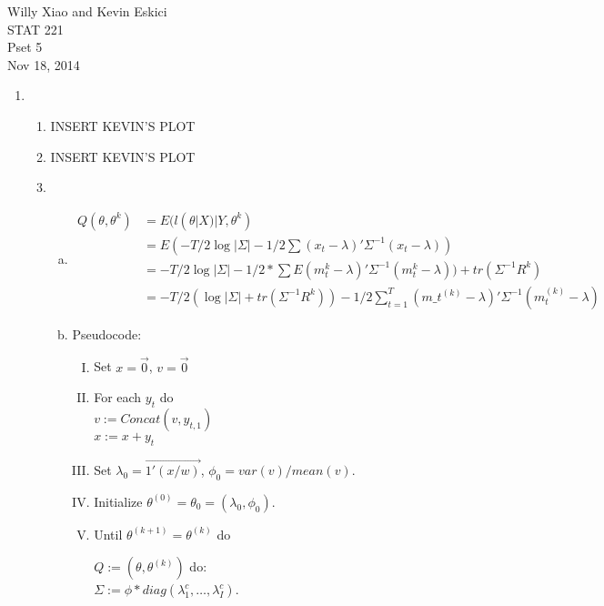 \documentclass[paper=a4, fontsize=11pt]{scrartcl}
\begin{document}
\noindent Willy Xiao and Kevin Eskici \\ STAT 221 \\Pset 5\\ Nov 18, 2014
\begin{enumerate}
  \item
    \begin{enumerate}[1]
      \item INSERT KEVIN'S PLOT
      \item INSERT KEVIN'S PLOT
      \item
        \begin{enumerate}[a.]
          \item
          \begin{align*}
            Q(\theta, \theta^k) &= E(l(\theta|X)|Y, \theta^k) \\
            &= E(-T/2\log{|\Sigma|} - 1/2\sum{(x_t-\lambda)'\Sigma^{-1}(x_t - \lambda)}) \\
            &= -T/2\log{|\Sigma|} - 1/2*\sum{E(m_t^k - \lambda)'\Sigma^{-1}(m_t^k - \lambda)) + tr(\Sigma^{-1}R^{k})} \\
            &= -T/2(\log{|\Sigma|} + tr(\Sigma^{-1}R^k)) - 1/2\sum_{t=1}^{T}{(m\_t^{(k)} - \lambda)'\Sigma^{-1}(m_t^{(k)} - \lambda)}
          \end{align*}
          \item Pseudocode:
            \begin{enumerate}[I.]
              \item Set $x = \vec{0}$, $v = \vec{0}$
              \item For each $y_t$ do \\
                \indent $v := Concat(v, y_{t,1})$ \\
                \indent $x := x + y_t$
              \item Set $\lambda_0 = \overrightarrow{1'(x/w)}$, $\phi_0 = var(v)/mean(v)$.
              \item Initialize $\theta^{(0)} = \theta_0 = (\lambda_0, \phi_0)$.
              \item Until $\theta^{(k+1)} = \theta^{(k)}$ do \\
                \begin{tabbing}
                  \hspace{1cm} $Q := (\theta, \theta^{(k)})$ do: \\
                  \hspace{2cm} $\Sigma := \phi*diag(\lambda_1^c, \ldots, \lambda_I^c)$. \\

\end{tabbing}
\end{enumerate}
\end{enumerate}
\end{enumerate}
\end{enumerate}
\end{document}
